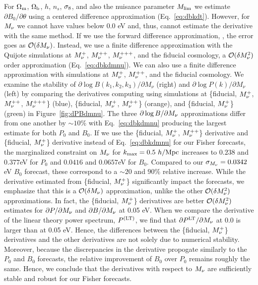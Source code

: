 For $\Omega_{\rm m}$, $\Omega_{\rm b}$, $h$, $n_s$, $\sigma_8$, and also the nuisance parameter $M_{\rm lim}$ 
we estimate $\partial B_0/\partial \theta$ using a centered difference approximation 
(Eq.~\ref{eq:dbkdt}). However, for $M_\nu$ we cannot have values below 0.0 eV 
and, thus, cannot estimate the derivative with the same method. If we use the 
forward difference approximation, 
\beq 
{} \approx {}, 
\eeq
the error goes as $\mathcal{O}(\delta M_\nu)$. Instead, we use a finite difference
approximation with the Quijote simulations at $M_\nu^{+}$, $M_\nu^{++}$, $M_\nu^{+++}$, 
and the fiducial cosmology, a $\mathcal{O}(\delta M_\nu^2)$ order approximation 
(Eq.~\ref{eq:dbkdmnu}). We can also use a finite difference approximation with 
simulations at $M_\nu^{+}$, $M_\nu^{++}$, and the fiducial cosmology. We examine
the stability of $\partial \log B(k_1, k_2, k_3)/\partial M_\nu$ (right) and 
$\partial \log P(k)/\partial M_\nu$ (left) by comparing the derivatives computing
using simulations at \{fiducial, $M_\nu^{+}$, $M_\nu^{++}$, $M_\nu^{+++}$\} (blue), 
\{fiducial, $M_\nu^{+}$, $M_\nu^{++}$\} (orange), and \{fiducial, $M_\nu^{+}$\} 
(green) in Figure~\ref{fig:dPBdmnu}. The three $\partial \log B/\partial M_\nu$
approximations differ from one another by $\sim10\%$ with Eq.~\ref{eq:dbkdmnu} 
producing the largest estimate for both $P_0$ and $B_0$. If we use the
\{fiducial, $M_\nu^{+}$, $M_\nu^{++}$\} derivative and \{fiducial, $M_\nu^{+}$\} derivative 
instead of Eq.~\ref{eq:dbkdmnu} for our Fisher forecasts, the marginalized constraint on
$M_\nu$ for $k_{\rm max} = 0.5~h/{\rm Mpc}$ increases to $0.238$ and $0.377$eV for $P_0$ 
and $0.0416$ and $0.0657$eV for $B_0$. Compared to our $\sigma_{M_\nu} = 0.0342$ eV 
$B_0$ forecast, these correspond to a $\sim20$ and $90\%$ relative increase. 
While the derivative estimated from \{fiducial, $M_\nu^{+}$\} significantly impact 
the forecasts, we emphasize that this is a $\mathcal{O}(\delta M_\nu)$ approximation, 
unlike the other $\mathcal{O}(\delta M_\nu^2)$ approximations. In fact, the 
\{fiducial, $M_\nu^{+}$\} derivatives are better $\mathcal{O}(\delta M_\nu^2)$ estimates
for $\partial P/\partial M_\nu$ and $\partial B/\partial M_\nu$ at 0.05 eV. When we 
compare the derivative of the linear theory power spectrum, $P^{(\rm LT)}$, we find 
that $\partial P^{\rm LT}/\partial M_\nu$ at 0.0 is larger than at 0.05 eV. Hence, 
the differences between the \{fiducial, $M_\nu^{+}$\} derivatives and the other 
derivatives are not solely due to numerical stability. Moreover, because the 
discrepancies in the derivative propogate similarly to the $P_0$ and $B_0$ forecasts, 
the relative improvement of $B_0$ over $P_0$ remains roughly the same. Hence, we conclude 
that the derivatives with respect to $M_\nu$ are sufficiently stable and robust for 
our Fisher forecasts.

